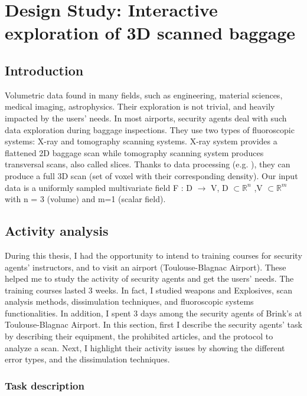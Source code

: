 \chapter{Design Study: Interactive exploration of 3D scanned baggage} %
\label{DesignStudy}

\section{Introduction}
Volumetric data found in many fields, such as engineering, material sciences, medical imaging, astrophysics. Their exploration is not trivial, and heavily impacted by the users' needs. In most airports, security agents deal with such data exploration during baggage inspections. They use two types of fluoroscopic systems: X-ray and tomography scanning systems. X-ray system provides a flattened 2D baggage scan while tomography scanning system produces transversal scans, also called slices. 
Thanks to data processing (e.g. \cite{deans2007radon}), they can produce a full 3D scan (set of voxel with their corresponding density).
Our input data is a uniformly sampled multivariate field F : D $\longrightarrow$ V, D $\subset \mathbb{R}^{n}$ 
,V $\subset \mathbb{R}^{m}$ with n = 3 (volume) and m=1 (scalar field).



\section{Activity analysis}

During this thesis, I had the opportunity to intend to training courses for security agents' instructors, and to visit an airport (Toulouse-Blagnac Airport). These helped me to study the activity of security agents and get the users' needs. The training courses lasted 3 weeks. In fact, I studied weapons and Explosives, scan analysis methods, dissimulation techniques, and fluoroscopic systems functionalities. In addition, I spent 3 days among the security agents of Brink's at Toulouse-Blagnac Airport. In this section, first I describe the security agents' task by describing their equipment, the prohibited articles, and the protocol to analyze a scan. Next, I highlight their activity issues by showing the different error types, and the dissimulation techniques.

\subsection{Task description}

